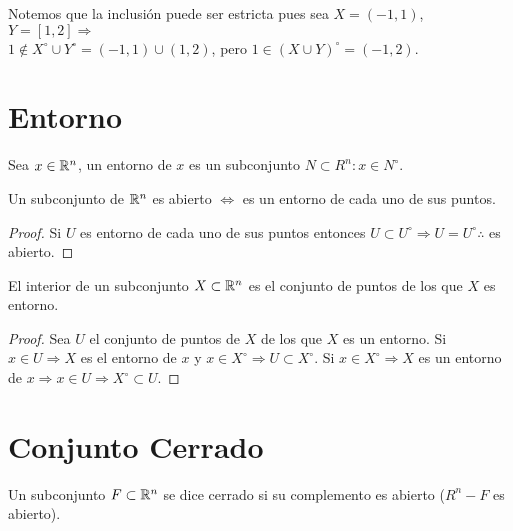 Notemos que la inclusión puede ser estricta pues sea \(X = (-1, 1)\), \(Y = [1, 2] \Rightarrow\) \\
\(1 \notin X^{\circ} \cup Y^{\circ} = (-1, 1) \cup (1, 2)\), pero \(1 \in (X \cup Y)^{\circ} = (-1, 2)\).

\section{Entorno}

\begin{definition}[Entorno]
  Sea \(x \in \mathbb{R}^n\), un entorno de \(x\) es un subconjunto \(N \subset R^n : x \in N^{\circ}\).
\end{definition}

\begin{prop}
  Un subconjunto de \(\mathbb{R}^n\) es abierto \(\iff\) es un entorno de cada uno de sus puntos.
  \begin{proof}
    Si \(U\) es entorno de cada uno de sus puntos entonces \(U \subset U^{\circ} \Rightarrow U = U^{\circ} \therefore\) es abierto.
  \end{proof}
\end{prop}

\begin{prop}
  El interior de un subconjunto \(X \subset \mathbb{R}^n\) es el conjunto de puntos de los que \(X\) es entorno.
  \begin{proof}
    Sea \(U\) el conjunto de puntos de \(X\) de los que \(X\) es un entorno. Si \(x \in U \Rightarrow X\) es el entorno de \(x\) y \(x \in X^{\circ} \Rightarrow U \subset X^{\circ}\). Si \(x \in X^{\circ} \Rightarrow X\) es un entorno de \(x \Rightarrow x \in U \Rightarrow X^{\circ} \subset U\).
  \end{proof}
\end{prop}

\section{Conjunto Cerrado}

\begin{definition}
  Un subconjunto \(F \subset \mathbb{R}^n\) se dice cerrado si su complemento es abierto (\(R^n - F\) es abierto).
\end{definition}


